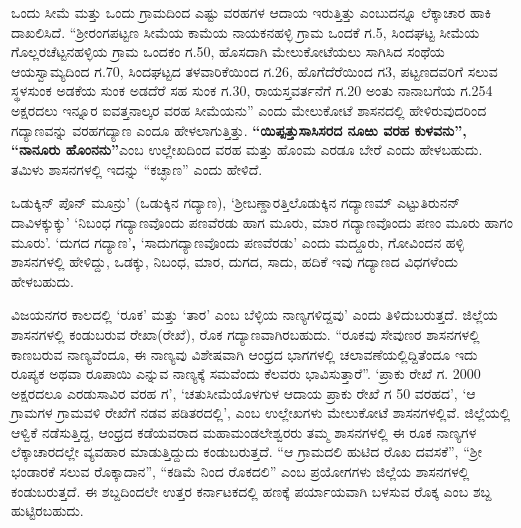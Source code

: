ಒಂದು ಸೀಮೆ ಮತ್ತು ಒಂದು ಗ್ರಾಮದಿಂದ ಎಷ್ಟು ವರಹಗಳ ಆದಾಯ ಇರುತ್ತಿತ್ತು ಎಂಬುದನ್ನೂ ಲೆಕ್ಕಾಚಾರ ಹಾಕಿ ದಾಖಲಿಸಿದೆ. “ಶ‍್ರೀರಂಗಪಟ್ಟಣ ಸೀಮೆಯ ಕಾಮೆಯ ನಾಯಕನಹಳ್ಳಿ ಗ್ರಾಮ ಒಂದಕೆ ಗ.5, ಸಿಂದಘಟ್ಟ ಸೀಮೆಯ ಗೊಲ್ಲರಚೆಟ್ಟನಹಳ್ಳಿಯ ಗ್ರಾಮ ಒಂದಕಂ ಗ.50, ಹೊಸದಾಗಿ ಮೇಲುಕೋಟೆಯಲು ಸಾಗಿಸಿದ ಸಂಥೆಯ ಆಯಸ್ವಾಮ್ಯದಿಂದ ಗ.70, ಸಿಂದಘಟ್ಟದ ತಳವಾರಿಕೆಯಿಂದ ಗ.26, ಹೊಗೆದೆರೆಯಿಂದ ಗ3, ಪಟ್ಟಣದವರಿಗೆ ಸಲುವ ಸ್ಥಳಸುಂಕ ಅಡಕೆಯ ಸುಂಕ ಅಡದೆರೆ ಸಹ ಸುಂಕ ಗ.30, ರಾಯಸ್ತವರ್ತನೆಗೆ ಗ.20 ಅಂತು ನಾನಾಬಗೆಯ ಗ.254 ಅಕ್ಷರದಲು ಇನ್ನೂರ ಐವತ್ತನಾಲ್ಕರ ವರಹ ಸೀಮೆಯನು” ಎಂದು ಮೇಲುಕೋಟೆ ಶಾಸನದಲ್ಲಿ ಹೇಳಿರುವುದರಿಂದ ಗದ್ಯಾಣವನ್ನು ವರಹಗದ್ಯಾಣ ಎಂದೂ ಹೇಳಲಾಗುತ್ತಿತ್ತು. \textbf{“ಯಿಪ್ಪತ್ತುಸಾಸಿಸರದ ನೂಱು ವರಹ ಕುಳವನು”, “ನಾನೂರು ಹೊಂನನು”}ಎಂಬ ಉಲ್ಲೇಖದಿಂದ ವರಹ ಮತ್ತು ಹೊಂಮ ಎರಡೂ ಬೇರೆ ಎಂದು ಹೇಳಬಹುದು. ತಮಿಳು ಶಾಸನಗಳಲ್ಲಿ ಇದನ್ನು “ಕಚ್ಛಾಣ” ಎಂದು ಹೇಳಿದೆ.

ಒಡುಕ್ಕಿನ್​ ಪೊನ್​ ಮೂನ್ರು’ (ಒಡುಕ್ಕಿನ ಗದ್ಯಾಣ), ‘ಶ‍್ರೀಬಣ್ಡಾರತ್ತಿಲೊಡುಕ್ಕಿನ ಗದ್ಯಾಣಮ್ ಎಟ್ಟು\break ತಿರುನನ್​ದಾವಿಳಕ್ಕುಕ್ಕು’  ‘ನಿಬಂಧ ಗದ್ಯಾಣವೊಂದು ಪಣವೆರಡು ಹಾಗ ಮೂರು, ಮಾರ ಗದ್ಯಾಣವೊಂದು ಪಣಂ ಮೂರು ಹಾಗಂ ಮೂರು’. ‘ದುಗದ ಗದ್ಯಾಣ’\textbf{,} ‘ಸಾದುಗದ್ಯಾಣವೊಂದು ಪಣವೆರಡು’ ಎಂದು ಮದ್ದೂರು, ಗೋವಿಂದನ ಹಳ್ಳಿ ಶಾಸನಗಳಲ್ಲಿ ಹೇಳಿದ್ದು, ಒಡಕ್ಕು, ನಿಬಂಧ, ಮಾರ, ದುಗದ, ಸಾದು, ಹದಿಕೆ ಇವು ಗದ್ಯಾಣದ ವಿಧಗಳೆಂದು ಹೇಳಬಹುದು.

ವಿಜಯನಗರ ಕಾಲದಲ್ಲಿ ‘ರೂಕ’ ಮತ್ತು ‘ತಾರ’ ಎಂಬ ಬೆಳ್ಳಿಯ ನಾಣ್ಯಗಳಿದ್ದವು’ ಎಂದು ತಿಳಿದುಬರುತ್ತದೆ. ಜಿಲ್ಲೆಯ ಶಾಸನಗಳಲ್ಲಿ ಕಂಡುಬರುವ ರೇಖಾ(ರೇಖೆ), ರೊಕ ಗದ್ಯಾಣವಾಗಿರಬಹುದು. “ರೂಕವು ಸೇವುಣರ ಶಾಸನಗಳಲ್ಲಿ ಕಾಣಬರುವ ನಾಣ್ಯವೆಂದೂ, ಈ ನಾಣ್ಯವು ವಿಶೇಷವಾಗಿ ಆಂಧ್ರದ ಭಾಗಗಳಲ್ಲಿ ಚಲಾವಣೆಯಲ್ಲಿದ್ದಿತೆಂದೂ ಇದು ರೂಪ್ಯಕ ಅಥವಾ ರೂಪಾಯಿ ಎನ್ನುವ ನಾಣ್ಯಕ್ಕೆ ಸಮವೆಂದು ಕೆಲವರು ಭಾವಿಸುತ್ತಾರೆ”. ‘ಪ್ರಾಕು ರೇಖೆ ಗ. 2000 ಅಕ್ಷರದಲೂ ಎರಡುಸಾವಿರ ವರಹ ಗ’, ‘ಚತುಸೀಮೆಯೊಳಗುಳ ಆದಾಯ ಪ್ರಾಕು ರೇಖೆ ಗ 50 ವರಹದ’, ‘ಆ ಗ್ರಾಮಗಳ ಗ್ರಾಮವಳಿ ರೇಖೆಗೆ ನಡವ ಪಡಿತರದಲ್ಲಿ’, ಎಂಬ ಉಲ್ಲೇಖಗಳು ಮೇಲುಕೋಟೆ ಶಾಸನಗಳಲ್ಲಿವೆ. ಜಿಲ್ಲೆಯಲ್ಲಿ ಆಳ್ವಿಕೆ ನಡೆಸುತ್ತಿದ್ದ, ಆಂಧ್ರದ ಕಡೆಯವರಾದ ಮಹಾಮಂಡಲೇಶ್ವರರು ತಮ್ಮ ಶಾಸನಗಳಲ್ಲಿ ಈ ರೂಕ ನಾಣ್ಯಗಳ ಲೆಕ್ಕಾಚಾರದಲ್ಲೇ ವ್ಯವಹಾರ ಮಾಡುತ್ತಿದ್ದುದು ಕಂಡುಬರುತ್ತದೆ. “ಆ ಗ್ರಾಮದಲಿ ಹುಟಿದ ರೊಖ ದವಸಕೆ”, “ಶ‍್ರೀ ಭಂಡಾರಕೆ ಸಲುವ ರೊಕ್ಕಾದಾನ”, “ಕಡಿಮೆ ನಿಂದ ರೊಕದಲಿ” ಎಂಬ ಪ್ರಯೋಗಗಳು ಜಿಲ್ಲೆಯ ಶಾಸನಗಳಲ್ಲಿ ಕಂಡುಬರುತ್ತದೆ. ಈ ಶಬ್ದದಿಂದಲೇ ಉತ್ತರ ಕರ್ನಾಟಕದಲ್ಲಿ ಹಣಕ್ಕೆ ಪರ್ಯಾಯವಾಗಿ ಬಳಸುವ ರೊಕ್ಕ ಎಂಬ ಶಬ್ದ ಹುಟ್ಟಿರಬಹುದು.

